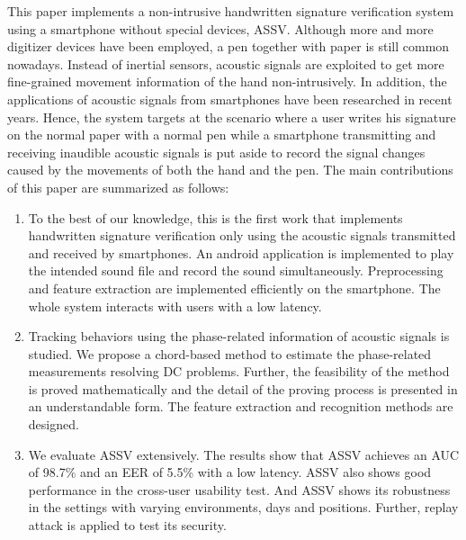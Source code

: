 \begin{englishabstract}
This paper implements a non-intrusive handwritten signature verification system using a smartphone without special devices, ASSV. Although more and more digitizer devices have been employed, a pen together with paper is still common nowadays. Instead of inertial sensors, acoustic signals are exploited to get more fine-grained movement information of the hand non-intrusively. In addition, the applications of acoustic signals from smartphones have been researched in recent years. Hence, the system targets at the scenario where a user writes his signature on the normal paper with a normal pen while a smartphone transmitting and receiving inaudible acoustic signals is put aside to record the signal changes caused by the movements of both the hand and the pen. The main contributions of this paper are summarized as follows: 
\begin{enumerate}[label=(\arabic*)]
	\item To the best of our knowledge, this is the first work that implements handwritten signature verification only using the acoustic signals transmitted and received by smartphones. An android application is implemented to play the intended sound file and record the sound simultaneously. Preprocessing and feature extraction are implemented efficiently on the smartphone. The whole system interacts with users with a low latency.
	\item Tracking behaviors using the phase-related information of acoustic signals is studied. We propose a \mbox{chord-based} method to estimate the phase-related measurements resolving DC problems. Further, the feasibility of the method is proved mathematically and the detail of the proving process  is presented in an understandable form. The feature extraction and recognition methods are designed.
	\item We evaluate ASSV extensively. The results show that ASSV achieves an AUC of 98.7\% and an EER of 5.5\% with a low latency. ASSV also shows good performance in the cross-user usability test. And ASSV shows its robustness in the settings with varying environments, days and positions. Further, replay attack is applied to test its security.
\end{enumerate}

\end{englishabstract}

